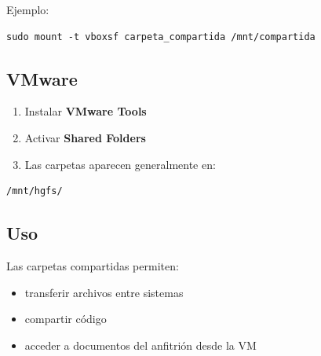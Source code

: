 \documentclass[11pt, letterpaper]{article}
\begin{document}
Ejemplo:

\begin{verbatim}
sudo mount -t vboxsf carpeta_compartida /mnt/compartida
\end{verbatim}
\subsection{VMware}
\label{sec:orgc94263b}

\begin{enumerate}
\item Instalar \textbf{VMware Tools}
\item Activar \textbf{Shared Folders}
\item Las carpetas aparecen generalmente en:
\end{enumerate}

\begin{verbatim}
/mnt/hgfs/
\end{verbatim}
\subsection{Uso}
\label{sec:org06f3ac2}

Las carpetas compartidas permiten:

\begin{itemize}
\item transferir archivos entre sistemas
\item compartir código
\item acceder a documentos del anfitrión desde la VM
\end{itemize}
\end{document}
